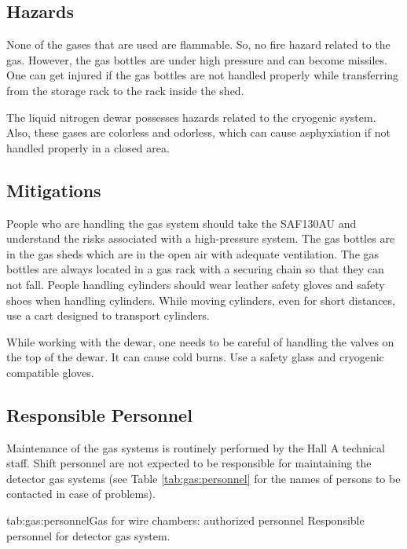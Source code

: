 \begin{safetyen}{0}{0}
\label{sec:hrs-det-gasalarms}


\subsection{Hazards}

None of the gases that are used are flammable. So, no fire hazard related to the gas. However, the gas bottles
are under high pressure and can become missiles.
 One can get injured if the gas bottles are not handled properly while transferring from the storage rack to the rack inside the shed.

The liquid nitrogen dewar possesses hazards related to the cryogenic system.
Also, these gases are colorless and odorless, which can cause asphyxiation if not handled properly in a closed area. 
\subsection{Mitigations}

People who are handling the gas system should take the SAF130AU and understand the risks associated with a high-pressure system. 
The gas bottles are in the gas sheds which are in the open air with adequate ventilation.
The gas bottles are always located in a gas rack with a securing chain so that they can not fall.
 People handling cylinders should wear leather safety gloves and safety shoes when handling cylinders. While moving cylinders, even for short distances, use a cart designed to transport cylinders.
 

While working with the dewar, one needs to be careful of handling the valves on the top of the dewar. It can cause cold burns. 
Use a safety glass and cryogenic compatible gloves.

\subsection{Responsible Personnel}

Maintenance of the gas systems is routinely performed by the Hall A
technical staff.  Shift personnel are not expected to be responsible
for maintaining the detector gas systems (see Table \ref{tab:gas:personnel}  
for the names of persons to be contacted in case of problems). 

\begin{namestab}{tab:gas:personnel}{Gas for wire chambers: authorized personnel}{%
      Responsible personnel for detector gas system.}
  \IbrahimAlbayrak{}
  \LarsGustavson{}
  \ChandanGhosh{}
\end{namestab}
\end{safetyen}
